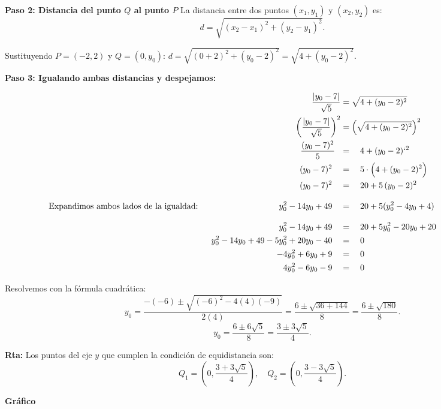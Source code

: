 \documentclass[11pt]{article}
\begin{document}
\begin{enumerate}[\hspace{-5mm} 1) ]
\textbf{Paso 2: Distancia del punto $Q$ al punto $P$}
La distancia entre dos puntos $(x_1, y_1)$ y $(x_2, y_2)$ es:
\[
    d = \sqrt{(x_2 - x_1)^2 + (y_2 - y_1)^2}.
\]

Sustituyendo $P = (-2,2)$ y $Q = (0, y_0)$: \quad $\displaystyle d = \sqrt{(0 + 2)^2 + (y_0 - 2)^2} = \sqrt{4 + (y_0 - 2)^2}. $ 

\textbf{Paso 3: Igualando ambas distancias y despejamos:}

\begin{align*}
    \frac{|y_0 - 7|}{\sqrt{5}} &= \sqrt{4 + (y_0 - 2)^2} &\ \hspace{.1\textwidth}
    \\ 
    \left(\frac{|y_0 - 7|}{\sqrt{5}}\right)^2 &= \left(\sqrt{4 + (y_0 - 2)^2} \right)^2
    \\
     \frac{(y_0 - 7)^2}{ 5 } \ \   &=  \ \ \ 4 + (y_0 - 2 )`^2
    \\ 
    (y_0 - 7)^2  \ \ \ &= \ \ \ 5\cdot \left( 4 + (y_0 - 2)^2  \rule{0mm}{4mm} \right)
    \\ 
    (y_0 - 7)^2 \quad &= \quad 20 + 5 \, (y_0 - 2)^2  
    \\[3mm]
    \text{Expandimos ambos lados de la igualdad:}\hspace{34mm}
     y_0^2 - 14y_0 + 49 \quad &= \quad  20 + 5(y_0^2 - 4y_0 + 4)
     \\[3mm]
     y_0^2 - 14y_0 + 49 \quad &= \quad  20 + 5y_0^2 - 20y_0 + 20
     \\
     y_0^2 - 14y_0 + 49 - 5y_0^2 + 20y_0 - 40 \quad &= \quad  0
     \\
      -4y_0^2 + 6y_0 + 9 \quad &= \quad  0
      \\
       4y_0^2 - 6y_0 - 9 \quad &= \quad  0
\end{align*}

Resolvemos con la fórmula cuadrática:
\[
    y_0 = \frac{-(-6) \pm \sqrt{(-6)^2 - 4(4)(-9)}}{2(4)} = \frac{6 \pm \sqrt{36 + 144}}{8} = \frac{6 \pm \sqrt{180}}{8}.
\]
\[
    y_0 = \frac{6 \pm 6\sqrt{5}}{8} = \frac{3 \pm 3\sqrt{5}}{4}.
\]

\textbf{Rta:} Los puntos del eje $y$ que cumplen la condición de equidistancia son:
\[
    Q_1 = \left(0, \frac{3 + 3\sqrt{5}}{4}\right), \quad Q_2 = \left(0, \frac{3 - 3\sqrt{5}}{4}\right).
\]

\textbf{Gráfico}


 \begin{center}
     
 

\end{center}
\end{enumerate}
\end{document}
